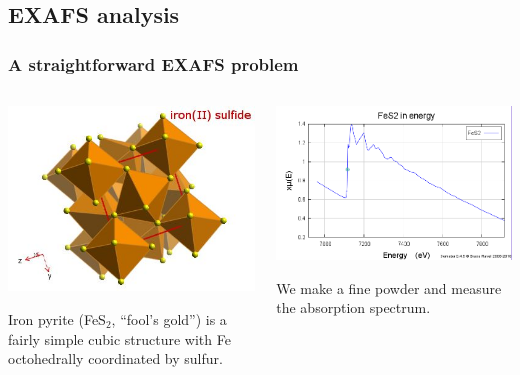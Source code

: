 \documentclass[10pt, xcolor=x11names, compress, handout]{beamer}
\begin{document}
\subsection[EXAFS analysis]{EXAFS analysis}
\begin{frame}
  \frametitle{A straightforward EXAFS problem}
  \begin{columns}
    \begin{column}{0.5\linewidth}
      \includegraphics[width=0.8\linewidth]{JM/FeS2.jpg}

      Iron pyrite (FeS$_2$, ``fool's gold'') is a fairly simple cubic
      structure with Fe octohedrally coordinated by sulfur.
    \end{column}
    \begin{column}{0.5\linewidth}
      \includegraphics[width=\linewidth]{JM/fes2_mu.png}

      We make a fine powder and measure the absorption spectrum.
    \end{column}
  \end{columns}
\end{frame}
\end{document}
